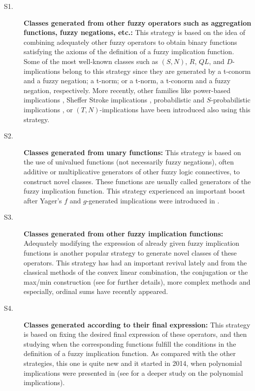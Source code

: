\begin{description}
	\item[S1.] \textbf{Classes generated from other fuzzy operators such as aggregation functions, fuzzy negations, etc.:} This strategy is based on the idea of combining adequately other fuzzy operators to obtain binary functions satisfying the axioms of the definition of a fuzzy implication function. Some of the most well-known classes such as $(S,N)$, $R$, $QL$, and $D$-implications belong to this strategy since they are generated by a t-conorm and a fuzzy negation; a t-norm; or a t-norm, a t-conorm and a fuzzy negation, respectively. More recently, other families like power-based implications \cite{Massanet2017}, Sheffer Stroke implications \cite{Baczynski2022B}, probabilistic and $S$-probabilistic implications \cite{Grzegorzewski2011}, or $(T,N)$-implications \cite{Bedregal2007} have been introduced also using this strategy.
	\item[S2.] \textbf{Classes generated from unary functions:} This strategy is based on the use of univalued functions (not necessarily fuzzy negations), often additive or multiplicative generators of other fuzzy logic connectives, to construct novel classes. These functions are usually called generators of the fuzzy implication function. This strategy experienced an important boost after Yager's $f$ and $g$-generated implications were introduced in \cite{Yager2004}.
	\item[S3.] \textbf{Classes generated from other fuzzy implication functions:} Adequately modifying the expression of already given fuzzy implication functions is another popular strategy to generate novel classes of these operators. This strategy has had an important revival lately and from the classical methods of the convex linear combination, the conjugation or the max/min construction (see \cite{Baczynski2008} for further details), more complex methods and especially, ordinal sums have recently appeared.
	\item[S4.] \textbf{Classes generated according to their final expression:} This strategy is based on fixing the desired final expression of these operators, and then studying when the corresponding functions fulfill the conditions in the definition of a fuzzy implication function. As compared with the other strategies, this one is quite new and it started in 2014, when polynomial implications were presented in \cite{Massanet2014} (see \cite{Massanet2022} for a deeper study on the polynomial implications).  
\end{description}
